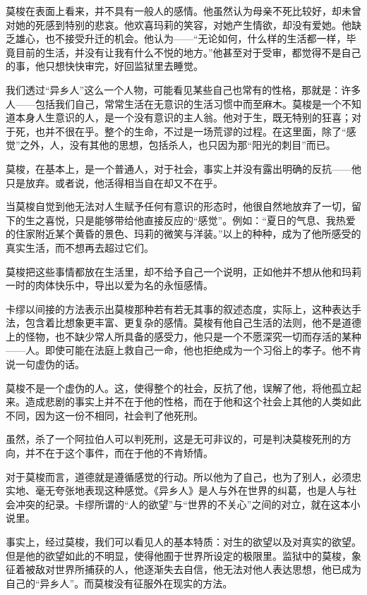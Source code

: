 \par 莫梭在表面上看来，并不具有一般人的感情。他虽然认为母亲不死比较好，却未曾对她的死感到特别的悲哀。他欢喜玛莉的笑容，对她产生情欲，却没有爱她。他缺乏雄心，也不接受升迁的机会。他认为——“无论如何，什么样的生活都一样，毕竟目前的生活，并没有让我有什么不悦的地方。”他甚至对于受审，都觉得不是自己的事，他只想快快审完，好回监狱里去睡觉。
\par 我们透过“异乡人”这么一个人物，可能看见某些自己也常有的性格，那就是：许多人——包括我们自己，常常生活在无意识的生活习惯中而至麻木。莫梭是一个不知道本身人生意识的人，是一个没有意识的主人翁。他对于生，既无特别的狂喜；对于死，也并不很在乎。整个的生命，不过是一场荒谬的过程。在这里面，除了“感觉”之外，人，没有其他的思想，包括杀人，也只因为那“阳光的刺目”而已。
\par 莫梭，在基本上，是一个普通人，对于社会，事实上并没有露出明确的反抗——他只是放弃。或者说，他活得相当自在却又不在乎。
\par 当莫梭自觉到他无法对人生赋予任何有意识的形态时，他很自然地放弃了一切，留下的生之喜悦，只是能够带给他直接反应的“感觉”。例如：“夏日的气息、我热爱的住家附近某个黄昏的景色、玛莉的微笑与洋装。”以上的种种，成为了他所感受的真实生活，而不想再去超过它们。
\par 莫梭把这些事情都放在生活里，却不给予自己一个说明，正如他并不想从他和玛莉一时的肉体快乐中，导出以爱为名的永恒感情。
\par 卡缪以间接的方法表示出莫梭那种若有若无其事的叙述态度，实际上，这种表达手法，包含着比想象更丰富、更复杂的感情。莫梭有他自己生活的法则，他不是道德上的怪物，也不缺少常人所具备的感受力，他只是一个不愿深究一切而存活的某种——人。即使可能在法庭上救自己一命，他也拒绝成为一个习俗上的孝子。他不肯说一句虚伪的话。
\par 莫梭不是一个虚伪的人。这，使得整个的社会，反抗了他，误解了他，将他孤立起来。造成悲剧的事实上并不在于他的性格，而在于他和这个社会上其他的人类如此不同，因为这一份不相同，社会判了他死刑。
\par 虽然，杀了一个阿拉伯人可以判死刑，这是无可非议的，可是判决莫梭死刑的方向，并不在于这个事件，而在于他的不肯矫情。
\par 对于莫梭而言，道德就是遵循感觉的行动。所以他为了自己，也为了别人，必须忠实地、毫无夸张地表现这种感觉。《异乡人》是人与外在世界的纠葛，也是人与社会冲突的纪录。卡缪所谓的“人的欲望”与“世界的不关心”之间的对立，就在这本小说里。
\par 事实上，经过莫梭，我们可以看见人的基本特质：对生的欲望以及对真实的欲望。但是他的欲望如此的不明显，使得他囿于世界所设定的极限里。监狱中的莫梭，象征着被敌对世界所捕获的人，他逐渐失去自信，他无法对他人表达思想，他已成为自己的“异乡人”。而莫梭没有征服外在现实的方法。
